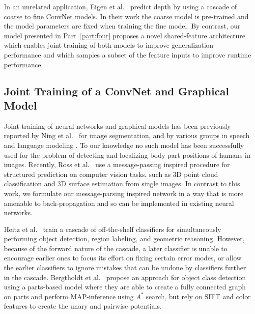 In an unrelated application, Eigen et al.~\cite{eigen2014} predict depth by using a cascade of coarse to fine ConvNet models. In their work the coarse model is pre-trained and the model parameters are fixed when training the fine model. By contrast, our model presented in Part~\ref{part:four} proposes a novel shared-feature architecture which enables joint training of both models to improve generalization performance and which samples a subset of the feature inputs to improve runtime performance.

\subsection*{Joint Training of a ConvNet and Graphical Model}

Joint training of neural-networks and graphical models has been previously reported by Ning et al.~\cite{ning05} for image segmentation, and by various groups in speech and language modeling \cite{bourlard1995remap, Morin05}. To our knowledge no such model has been successfully used for the problem of detecting and localizing body part positions of humans in images.  Recently, Ross et al.~\cite{ross_learning_message_passing} use a message-passing inspired procedure for structured prediction on computer vision tasks, such as 3D point cloud classification and 3D surface estimation from single images. In contrast to this work, we formulate our message-parsing inspired network in a way that is more amenable to back-propagation and so can be implemented in existing neural networks. 

Heitz et al.~\cite{Heitz_cascadedclassification} train a cascade of off-the-shelf classifiers for simultaneously performing object detection, region labeling, and geometric reasoning. However, because of the forward nature of the cascade, a later classifier is unable to encourage earlier ones to focus its effort on fixing certain error modes, or allow the earlier classifiers to ignore mistakes that can be undone by classifiers further in the cascade. Bergtholdt et al.~\cite{bergtholdt2010study} propose an approach for object class detection using a parts-based model where they are able to create a fully connected graph on parts and perform MAP-inference using $A^{*}$ search, but rely on SIFT and color features to create the unary and pairwise potentials.

